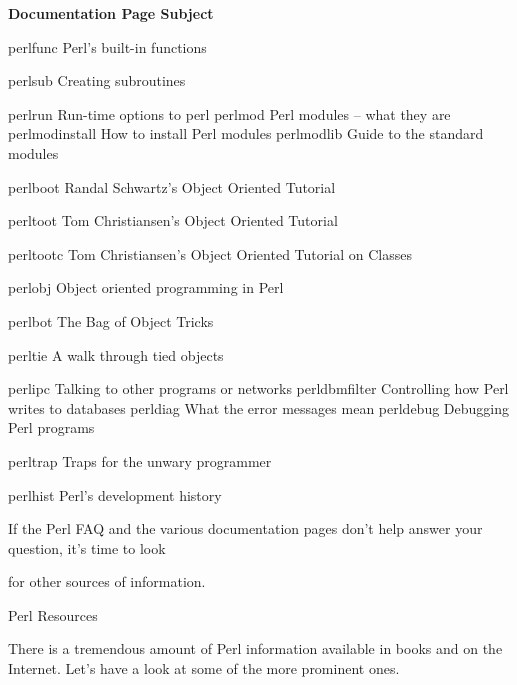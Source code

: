 \documentclass[a4paper,11pt]{book}
\begin{document}
\noindent \textbf{Documentation Page Subject}

\noindent 

\noindent perlfunc Perl's built-in functions

\noindent 

\noindent perlsub Creating subroutines

\noindent 

\noindent perlrun Run-time options to perl perlmod Perl modules -- what they are perlmodinstall How to install Perl modules perlmodlib Guide to the standard modules

\noindent perlboot Randal Schwartz's Object Oriented Tutorial

\noindent 

\noindent perltoot Tom Christiansen's Object Oriented Tutorial

\noindent 

\noindent perltootc Tom Christiansen's Object Oriented Tutorial on Classes

\noindent 

\noindent perlobj Object oriented programming in Perl

\noindent 

\noindent perlbot The Bag of Object Tricks

\noindent 

\noindent perltie A walk through tied objects

\noindent 

\noindent perlipc Talking to other programs or networks perldbmfilter Controlling how Perl writes to databases perldiag What the error messages mean perldebug Debugging Perl programs

\noindent perltrap Traps for the unwary programmer

\noindent 

\noindent perlhist Perl's development history

\noindent 

\noindent If the Perl FAQ and the various documentation pages don't help answer your question, it's time to look

\noindent for other sources of information.

\noindent 

\noindent Perl Resources

\noindent 

\noindent There is a tremendous amount of Perl information available in books and on the Internet. Let's have a look at some of the more prominent ones.
\end{document}
